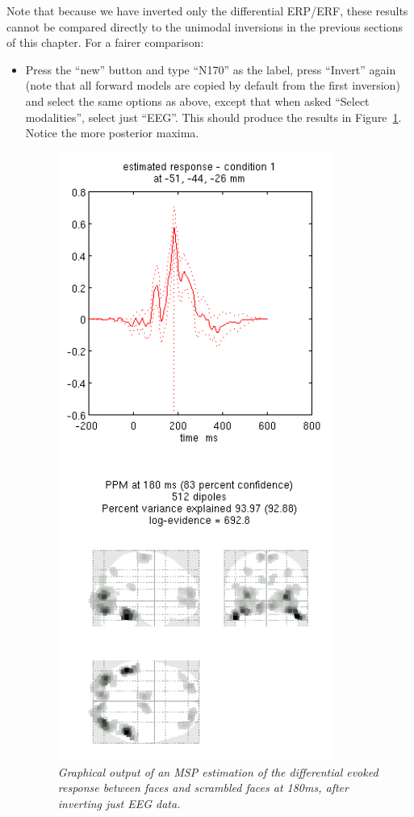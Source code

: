 Note that because we have inverted only the differential ERP/ERF, these results cannot be compared directly to the unimodal inversions in the previous sections of this chapter. For a fairer comparison:

\begin{itemize}
\item Press the ``new'' button and type ``N170'' as the label, press ``Invert'' again (note that all forward models are copied by default from the first inversion) and select the same options as above, except that when asked ``Select modalities'', select just ``EEG''. This should produce the results in Figure~\ref{multimodal:fusion:fig:2}. Notice the more posterior maxima.

\begin{figure}
\begin{center}
\includegraphics[width=90mm]{multimodal/figures/fused_eeg_msp.png}
\caption{\em Graphical output of an MSP estimation of the differential evoked response between faces and scrambled faces at 180ms, after inverting just EEG data. \label{multimodal:fusion:fig:2}}
\end{center}
\end{figure}


\end{itemize}
